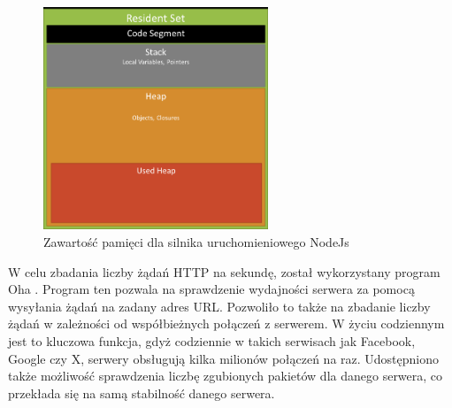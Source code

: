 \begin{figure}[h]
  \centering
  \includegraphics[width=0.6\textwidth]{Figures/memoryUsage.png}
  \caption{Zawartość pamięci dla silnika uruchomieniowego NodeJs \cite{memoryUsageImage}}
  \label{fig:memory}
\end{figure}

W celu zbadania liczby żądań HTTP na sekundę, został wykorzystany program Oha \cite{oha}. Program ten pozwala na sprawdzenie wydajności serwera za pomocą wysyłania żądań na zadany adres URL. Pozwoliło to także na zbadanie liczby żądań w zależności od współbieżnych połączeń z serwerem. W życiu codziennym jest to kluczowa funkcja, gdyż codziennie w takich serwisach jak Facebook, Google czy X, serwery obsługują kilka milionów połączeń na raz. Udostępniono także możliwość sprawdzenia liczbę zgubionych pakietów dla danego serwera, co przekłada się na samą stabilność danego serwera.